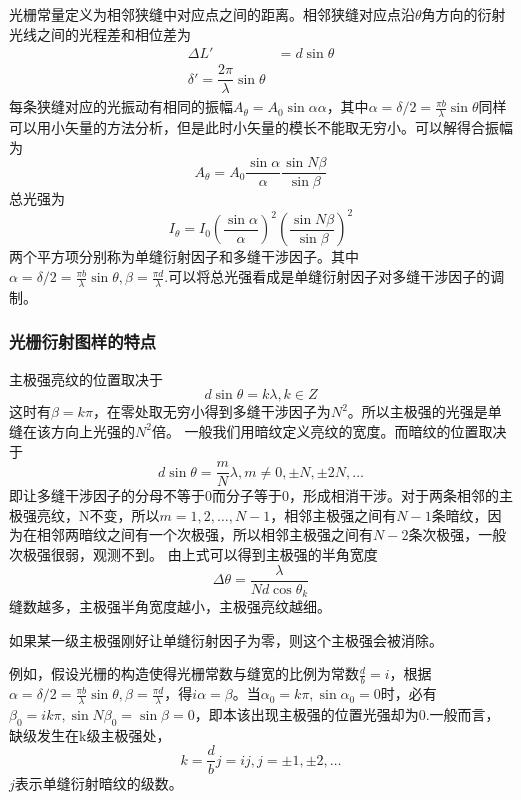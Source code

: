 光栅常量定义为相邻狭缝中对应点之间的距离。相邻狭缝对应点沿$\theta$角方向的衍射光线之间的光程差和相位差为
\begin{align}
    \Delta L'&=d \sin \theta\\
    \delta '= \dfrac{2 \pi }{\lambda}\sin \theta
\end{align}
每条狭缝对应的光振动有相同的振幅$A_\theta=A_0\sin \alpha \alpha$，其中$\alpha=\delta /2 = \frac{\pi b}{\lambda} \sin \theta$同样可以用小矢量的方法分析，但是此时小矢量的模长不能取无穷小。可以解得合振幅为
\begin{equation}
    A_\theta = A_0 \dfrac{\sin \alpha}{\alpha}\dfrac{\sin N\beta}{\sin \beta}
\end{equation}
总光强为
\begin{equation}
    I_\theta = I_0(\dfrac{\sin \alpha}{\alpha})^2(\dfrac{\sin N\beta}{\sin \beta})^2
\end{equation}
两个平方项分别称为单缝衍射因子和多缝干涉因子。其中$\alpha=\delta /2 = \frac{\pi b}{\lambda} \sin \theta,\beta =  \frac{\pi d}{\lambda}$.可以将总光强看成是单缝衍射因子对多缝干涉因子的调制。
\subsubsection{光栅衍射图样的特点}
主极强亮纹的位置取决于$$d\sin \theta=k \lambda,k\in Z$$
这时有$\beta = k \pi$，在零处取无穷小得到多缝干涉因子为$N^2$。所以主极强的光强是单缝在该方向上光强的$N^2$倍。
一般我们用暗纹定义亮纹的宽度。而暗纹的位置取决于
\begin{equation}
    d \sin \theta = \dfrac{m}{N}\lambda , m\neq 0,\pm N ,\pm 2N,\dots
\end{equation}
即让多缝干涉因子的分母不等于0而分子等于0，形成相消干涉。对于两条相邻的主极强亮纹，N不变，所以$m=1,2,\dots,N-1$，相邻主极强之间有$N-1$条暗纹，因为在相邻两暗纹之间有一个次极强，所以相邻主极强之间有$N-2$条次极强，一般次极强很弱，观测不到。
由上式可以得到主极强的半角宽度
\begin{equation}
    \Delta \theta = \dfrac{\lambda}{N d \cos \theta_k}
\end{equation}
缝数越多，主极强半角宽度越小，主极强亮纹越细。

如果某一级主极强刚好让单缝衍射因子为零，则这个主极强会被消除。

例如，假设光栅的构造使得光栅常数与缝宽的比例为常数$\frac{d}{b}=i$，根据$\alpha=\delta /2 = \frac{\pi b}{\lambda} \sin \theta,\beta =  \frac{\pi d}{\lambda}$，得$i\alpha=\beta$。当$\alpha_0=k \pi ,\sin \alpha_0=0$时，必有$\beta_0=ik \pi ,\sin N \beta_0=\sin \beta=0$，即本该出现主极强的位置光强却为0.一般而言，缺级发生在k级主极强处，
\begin{equation}
    k=\dfrac{d}{b}j=ij,j=\pm 1,\pm 2,\dots
\end{equation}
$j$表示单缝衍射暗纹的级数。
